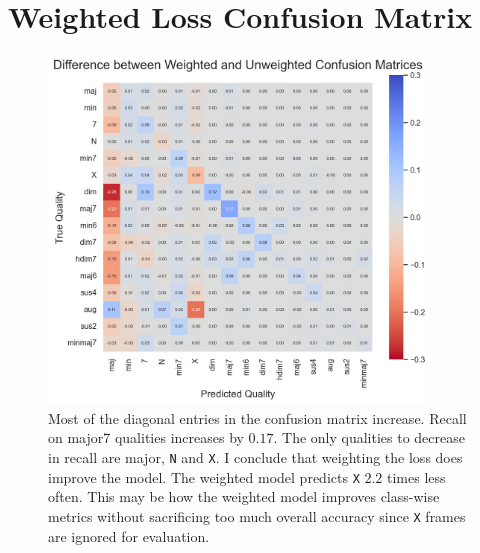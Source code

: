 \section{Weighted Loss Confusion Matrix}\label{app:weighted_loss_confusion_matrix}

\begin{figure}[H]
    \centering
    \hspace{-1.5cm}
    \includegraphics[width=0.9\textwidth]{figures/confusion_matrix_difference.png}
    \caption{ Most of the diagonal entries in the confusion matrix increase. Recall on major7 qualities increases by $0.17$. The only qualities to decrease in recall are major, \texttt{N} and \texttt{X}. I conclude that weighting the loss does improve the model. The weighted model predicts \texttt{X} $2.2$ times less often. This may be how the weighted model improves class-wise metrics without sacrificing too much overall accuracy since \texttt{X} frames are ignored for evaluation.}\label{fig:hmm_smoothing_example}
\end{figure}

